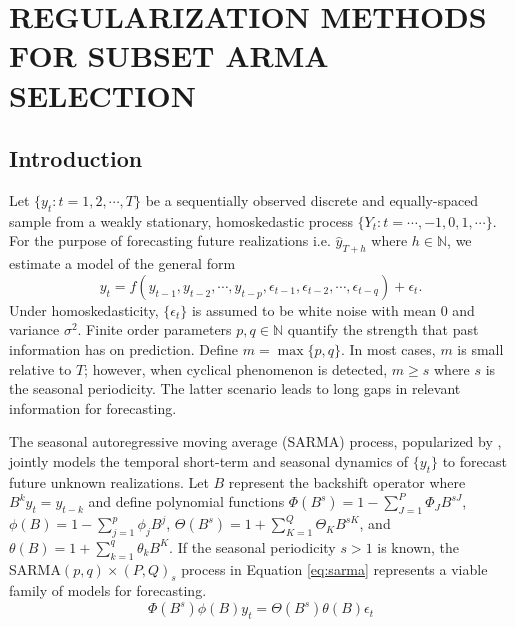 \chapter{REGULARIZATION METHODS FOR SUBSET ARMA SELECTION}
\label{chap:co2}

\section{Introduction}

Let $\{y_t: t=1,2,\cdots,T\}$ be a sequentially observed discrete and equally-spaced sample from a weakly stationary, homoskedastic process $\{Y_t:t=\cdots,-1,0,1,\cdots\}$. For the purpose of forecasting future realizations i.e. $\hat{y}_{T+h}$ where $h\in\mathbb{N}$, we estimate a model of the general form $$y_{t}=f(y_{t-1},y_{t-2},\cdots,y_{t-p},\epsilon_{t-1},\epsilon_{t-2},\cdots,\epsilon_{t-q})+\epsilon_t.$$ Under homoskedasticity, $\{\epsilon_t\}$ is assumed to be white noise with mean 0 and variance $\sigma^2$.  Finite order parameters $p,q\in\mathbb{N}$ quantify the strength that past information has on prediction. Define $m=\max\{p,q\}$. In most cases, $m$ is small relative to $T$; however, when cyclical phenomenon is detected, $m\geq s$ where $s$ is the seasonal periodicity. The latter scenario leads to long gaps in relevant information for forecasting.

The seasonal autoregressive moving average (SARMA) process, popularized by \cite{Box1976}, jointly models the temporal short-term and seasonal dynamics of $\{y_t\}$ to forecast future unknown realizations. Let $B$ represent the backshift operator  where $B^ky_{t}=y_{t-k}$ and define polynomial functions $\Phi(B^s)=1-\sum\limits_{J=1}^P \Phi_J B^{sJ}$, $\phi(B)=1-\sum\limits_{j=1}^p \phi_j B^{j}$, $\Theta(B^s)=1+\sum\limits_{K=1}^Q \Theta_K B^{sK}$, and $\theta(B)=1+\sum\limits_{k=1}^q \theta_k B^{K}$. If the seasonal periodicity $s>1$ is known, the SARMA$(p,q)\times(P,Q)_{s}$ process in Equation \ref{eq:sarma} represents a viable family of models for forecasting.
\begin{equation}
\label{eq:sarma}
\Phi(B^s)\phi(B)y_t=\Theta(B^s)\theta(B)\epsilon_t
\end{equation}

